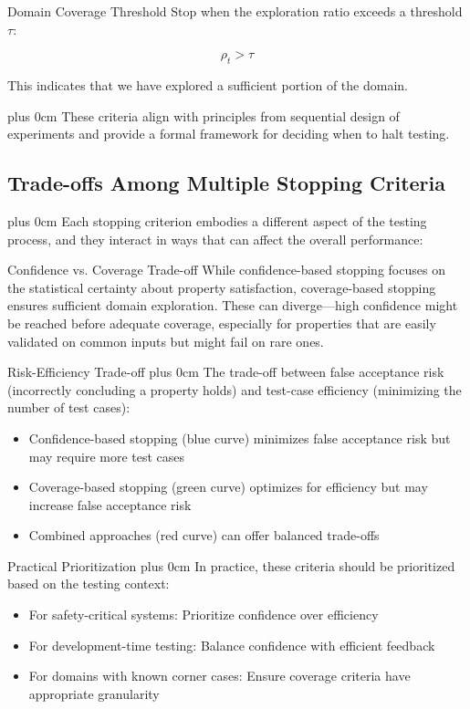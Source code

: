 \documentclass[11pt,a4paper]{article}
\newcommand{\justifytext}{\leftskip=0pt \rightskip=0pt plus 0cm}
\begin{document}
\begin{definitionbox}{Domain Coverage Threshold}
Stop when the exploration ratio exceeds a threshold $\tau$:

\begin{equation}
\rho_t > \tau
\end{equation}

This indicates that we have explored a sufficient portion of the domain.
\end{definitionbox}

\justifytext
These criteria align with principles from sequential design of experiments \cite{chaloner1995} and provide a formal framework for deciding when to halt testing.

\subsection{Trade-offs Among Multiple Stopping Criteria}

\justifytext
Each stopping criterion embodies a different aspect of the testing process, and they interact in ways that can affect the overall performance:

\begin{theorembox}{Confidence vs. Coverage Trade-off}
While confidence-based stopping focuses on the statistical certainty about property satisfaction, coverage-based stopping ensures sufficient domain exploration. These can diverge—high confidence might be reached before adequate coverage, especially for properties that are easily validated on common inputs but might fail on rare ones.
\end{theorembox}

\begin{theorembox}{Risk-Efficiency Trade-off}
\justifytext
The trade-off between false acceptance risk (incorrectly concluding a property holds) and test-case efficiency (minimizing the number of test cases):
\begin{itemize}
\item Confidence-based stopping (blue curve) minimizes false acceptance risk but may require more test cases
\item Coverage-based stopping (green curve) optimizes for efficiency but may increase false acceptance risk
\item Combined approaches (red curve) can offer balanced trade-offs
\end{itemize}
\end{theorembox}

\begin{theorembox}{Practical Prioritization}
\justifytext
In practice, these criteria should be prioritized based on the testing context:
\begin{itemize}
\item For safety-critical systems: Prioritize confidence over efficiency
\item For development-time testing: Balance confidence with efficient feedback
\item For domains with known corner cases: Ensure coverage criteria have appropriate granularity
\end{itemize}
\end{theorembox}
\end{document}
